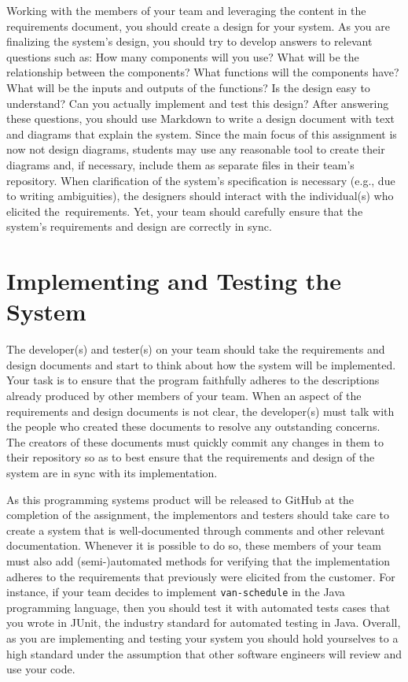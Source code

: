 Working with the members of your team and leveraging the content in the requirements document, you should create a
design for your system.  As you are finalizing the system's design, you should try to develop answers to relevant
questions such as: How many components will you use? What will be the relationship between the components? What
functions will the components have? What will be the inputs and outputs of the functions?  Is the design easy to
understand?  Can you actually implement and test this design? After answering these questions, you should use Markdown
to write a design document with text and diagrams that explain the system. Since the main focus of this assignment is
now not design diagrams, students may use any reasonable tool to create their diagrams and, if necessary, include them
as separate files in their team's repository. When clarification of the system's specification is necessary (e.g., due
to writing ambiguities), the designers should interact with the individual(s) who elicited \mbox{the requirements}. Yet,
your team should carefully ensure that the system's requirements and design are correctly in sync.

\section*{Implementing and Testing the System}

The developer(s) and tester(s) on your team should take the requirements and design documents and start to think about
how the system will be implemented. Your task is to ensure that the program faithfully adheres to the descriptions
already produced by other members of your team. When an aspect of the requirements and design documents is not clear,
the developer(s) must talk with the people who created these documents to resolve any outstanding concerns. The creators
of these documents must quickly commit any changes in them to their repository so as to best ensure that the
requirements and design of the system are in sync with its implementation.

As this programming systems product will be released to GitHub at the completion of the assignment, the implementors and
testers should take care to create a system that is well-documented through comments and other relevant documentation.
Whenever it is possible to do so, these members of your team must also add (semi-)automated methods for verifying that
the implementation adheres to the requirements that previously were elicited from the customer. For instance, if your
team decides to implement {\tt van-schedule} in the Java programming language, then you should test it with automated
tests cases that you wrote in JUnit, the industry standard for automated testing in Java. Overall, as you are
implementing and testing your system you should hold yourselves to a high standard under the assumption that other
software engineers will review and use your code.


